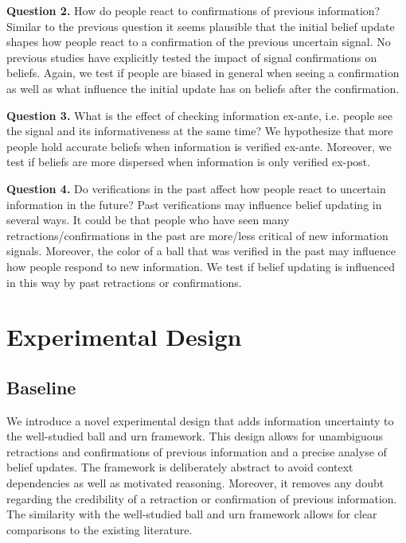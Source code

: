 \documentclass{article}
\begin{document}
\textbf{Question 2.} How do people react to confirmations of previous information? Similar to the previous question it seems plausible that the initial belief update shapes how people react to a confirmation of the previous uncertain signal. No previous studies have explicitly tested the impact of signal confirmations on beliefs. Again, we test if people are biased in general when seeing a confirmation as well as what influence the initial update has on beliefs after the confirmation.

\textbf{Question 3.} What is the effect of checking information ex-ante, i.e. people see the signal and its informativeness at the same time? We hypothesize that more people hold accurate beliefs when information is verified ex-ante. Moreover, we test if beliefs are more dispersed when information is only verified ex-post. 

\textbf{Question 4.} Do verifications in the past affect how people react to uncertain information in the future? Past verifications may influence belief updating in several ways. It could be that people who have seen many retractions/confirmations in the past are more/less critical of new information signals. Moreover, the color of a ball that was verified in the past may influence how people respond to new information. We test if belief updating is influenced in this way by past retractions or confirmations.


\section{Experimental Design}

\subsection{Baseline}

We introduce a novel experimental design that adds information uncertainty to the well-studied ball and urn framework. This design allows for unambiguous retractions and confirmations of previous information and a precise analyse of belief updates. The framework is deliberately abstract to avoid context dependencies as well as motivated reasoning. Moreover, it removes any doubt regarding the credibility of a retraction or confirmation of previous information. The similarity with the well-studied ball and urn framework allows for clear comparisons to the existing literature.
\end{document}
